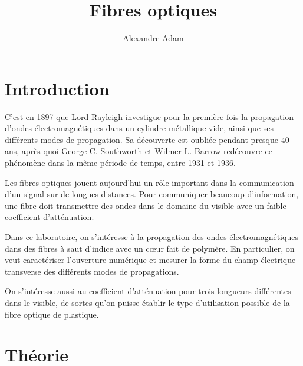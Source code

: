 \documentclass[10pt,letterpaper,twocolumn]{article}
\title{\vspace{-10mm}\Large
Fibres optiques%
\vspace{-4mm}}
\author{\large
Alexandre Adam
}
\date{\vspace{-8mm}}
\newcommand{\s}{\hspace{0.1cm}}
\newcommand{\na}{\text{N.A.}}
\begin{document}
\twocolumn[
\maketitle
\begin{onecolabstract} %
Six modes ont étés observés avec la fibre monomodes III (fibre A) en utilisant un laser GaN de longueur d'onde $\lambda = 405\s nm$. Quatre modes sont observés avec la fibre monomode II (fibre B), incluant le mode $LP_{02}$. Ces observations sont supplées par la mesure de l'ouverture numérique de la fibre A ($\na = 0.203 \pm 0.002$) et de la fibre B ($\na =  0.128 \pm  0.002$). Cette mesure est aussi performée pour une fibre multimode ($\na = 0.232 \pm 0.007$), pour laquelle on mesure l'atténuation à trois longueurs d'ondes différentes. On trouve que la fibre multimode ne peut pas être utilisée pour les communications longue distance. 
\vspace{4mm} %
\end{onecolabstract}
]

\section{Introduction}\label{intro} %
C'est en 1897 que Lord Rayleigh investigue pour la première fois la propagation d'ondes électromagnétiques dans un cylindre métallique vide, ainsi que ses différents modes de propagation. Sa découverte est oubliée pendant presque 40 ans, après quoi George C. Southworth et Wilmer L. Barrow redécouvre ce phénomène dans la même période de temps, entre 1931 et 1936\supercite{Packard1984}. \par
Les fibres optiques jouent aujourd'hui un rôle important dans la communication d'un signal sur de longues distances. Pour communiquer beaucoup d'information, une fibre doit transmettre des ondes dans le domaine du visible avec un faible coefficient d'atténuation. \par
Dans ce laboratoire, on s'intéresse à la propagation des ondes électromagnétiques dans des fibres à saut d'indice avec un c\oe{}ur fait de polymère. En particulier, on veut caractériser l'ouverture numérique et mesurer la forme du champ électrique transverse des différents modes de propagations. \par
On s'intéresse aussi au coefficient d'atténuation pour trois longueurs différentes dans le visible, de sortes qu'on puisse établir le type d'utilisation possible de la fibre optique de plastique.

\section{Théorie}\label{sec:theorie} %
\end{document}
